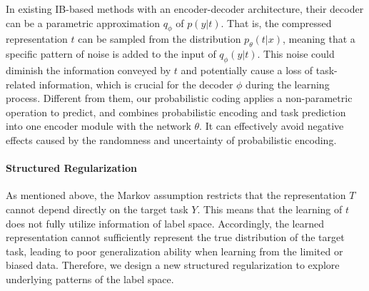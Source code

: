 \documentclass[letterpaper]{article} %
\begin{document}
In existing IB-based methods \cite{DBLP:conf/iclr/AlemiFD017,DBLP:journals/entropy/Fischer20,DBLP:conf/cvpr/AnJC23} with an encoder-decoder architecture, their decoder can be a parametric approximation $q_{\phi}$ of $p(y|t)$. That is, the compressed representation $t$ can be sampled from the distribution $p_{\theta}(t|x)$, meaning that a specific pattern of noise is added to the input of $q_{\phi}(y|t)$. This noise could diminish the information conveyed by $t$ and potentially cause a loss of task-related information, which is crucial for the decoder $\phi$ during the learning process.
Different from them, our probabilistic coding applies a non-parametric operation to predict, and combines probabilistic encoding and task prediction into one encoder module with the network $\theta$. It can effectively avoid negative effects caused by the randomness and uncertainty of probabilistic encoding.

 

\paragraph{Structured Regularization}
As mentioned above, the Markov assumption restricts that the representation $T$ cannot depend directly on the target task $Y$.
This means that the learning of $t$ does not fully utilize information of label space. 
Accordingly, the learned representation cannot sufficiently represent the true distribution of the target task, leading to poor generalization ability when learning from the limited or biased data.
Therefore, we design a new structured regularization to explore underlying patterns of the label space.
\end{document}

